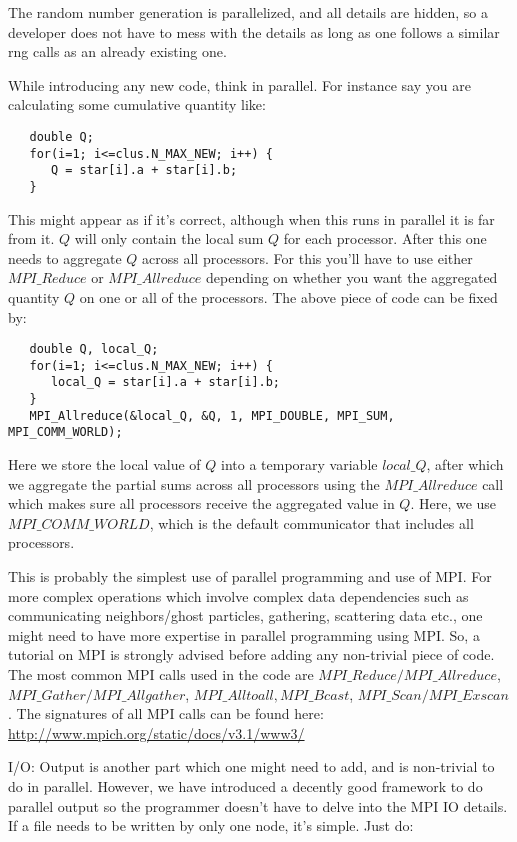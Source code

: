 \documentclass[11pt]{article}
\begin{document}
The random number generation is parallelized, and all details are hidden, so a developer does not have to mess with the details as long as one follows a similar rng calls as an already existing one.

While introducing any new code, think in parallel. For instance say you are calculating some cumulative quantity like:

\begin{lstlisting}
   double Q;
   for(i=1; i<=clus.N_MAX_NEW; i++) {
      Q = star[i].a + star[i].b;
   }
\end{lstlisting}

This might appear as if it's correct, although when this runs in parallel it is far from it. $Q$ will only contain the local sum $Q$ for each processor. After this one needs to aggregate $Q$ across all processors. For this you'll have to use either $MPI\_Reduce$ or $MPI\_Allreduce$ depending on whether you want the aggregated quantity $Q$ on one or all of the processors. The above piece of code can be fixed by:

\begin{lstlisting}
   double Q, local_Q;
   for(i=1; i<=clus.N_MAX_NEW; i++) {
      local_Q = star[i].a + star[i].b;
   }
   MPI_Allreduce(&local_Q, &Q, 1, MPI_DOUBLE, MPI_SUM, MPI_COMM_WORLD);
\end{lstlisting}

Here we store the local value of $Q$ into a temporary variable $local\_Q$, after which we aggregate the partial sums across all processors using the $MPI\_Allreduce$ call which makes sure all processors receive the aggregated value in $Q$. Here, we use $MPI\_COMM\_WORLD$, which is the default communicator that includes all processors.

This is probably the simplest use of parallel programming and use of MPI. For more complex operations which involve complex data dependencies such as communicating neighbors/ghost particles, gathering, scattering data etc., one might need to have more expertise in parallel programming using MPI. So, a tutorial on MPI is strongly advised before adding any non-trivial piece of code. The most common MPI calls used in the code are $MPI\_Reduce/MPI\_Allreduce$, $MPI\_Gather/MPI\_Allgather$, $MPI\_Alltoall, MPI\_Bcast$, $MPI\_Scan/MPI\_Exscan$. The signatures of all MPI calls can be found here: \url{http://www.mpich.org/static/docs/v3.1/www3/}

I/O:
Output is another part which one might need to add, and is non-trivial to do in parallel. However, we have introduced a decently good framework to do parallel output so the programmer doesn't have to delve into the MPI IO details. If a file needs to be written by only one node, it's simple. Just do:
\end{document}
